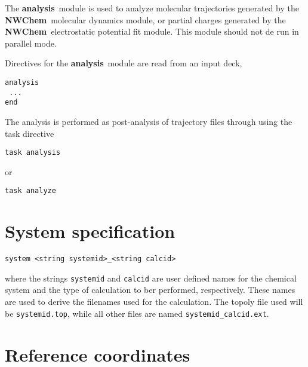 \label{sec:analysis}
\def\bmu{\mbox{\boldmath $\mu$}}
\def\bE{\mbox{\bf E}}
\def\br{\mbox{\bf r}}
\def\tT{\tilde{T}}
\def\t{\tilde{1}}
\def\ip{i\prime}
\def\jp{j\prime}
\def\ipp{i\prime\prime}
\def\jpp{j\prime\prime}
\def\etal{{\sl et al.}}
\def\nwchem{{\bf NWChem}}
\def\nwargos{{\bf nwargos}}
\def\nwtop{{\bf nwtop}}
\def\nwrst{{\bf nwrst}}
\def\nwsgm{{\bf nwsgm}}
\def\esp{{\bf esp}}
\def\md{{\bf md}}
\def\prepare{{\bf prepare}}
\def\analysis{{\bf analysis}}
\def\argos{{\bf ARGOS}}
\def\amber{{\bf AMBER}}
\def\charmm{{\bf CHARMM}}
\def\discover{{\bf DISCOVER}}
\def\povray{{\bf povray}}
\def\gopenmol{{\bf gOpenMol}}
\def\ecce{{\bf ecce}}

The \analysis\ module is used to analyze molecular trajectories generated
by the \nwchem\ molecular dynamics module, or partial charges generated
by the \nwchem\ electrostatic potential fit module. This module should
not de run in parallel mode.

Directives for the \analysis\ module are read from an input deck,

\begin{verbatim}
analysis
 ...
end
\end{verbatim}

The analysis is performed  as post-analysis of trajectory files through 
using the {\rm task} directive

\begin{verbatim}
task analysis
\end{verbatim}
or
\begin{verbatim}
task analyze
\end{verbatim}

\section{System specification}

\begin{verbatim}
system <string systemid>_<string calcid>
\end{verbatim}

where the strings \verb+systemid+ and \verb+calcid+ are user defined names
for the chemical system and the type of calculation to ber performed, 
respectively. These names are used to derive the filenames used for the
calculation. The topoly file used will be \verb+systemid.top+, while all
other files are named \verb+systemid_calcid.ext+.

\section{Reference coordinates}

